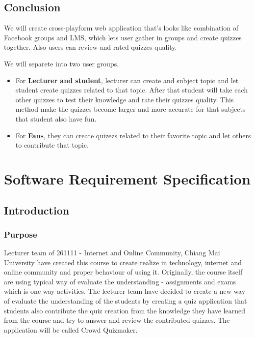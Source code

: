 \documentclass[ 10pt]{report}
\begin{document}
    \pagebreak
    \section{Conclusion}

    We will create cross-playform web application that's looks like combination of Facebook groups and LMS, which lets user gather in groups and create quizzes together. Also users can review and rated quizzes quality.

    We will separete into two user groups.
    \begin{itemize}
        \item For \textbf{Lecturer and student}, lecturer can create and subject topic and let student create quizzes related to that topic. After that student will take each other quizzes to test their knowledge and rate their quizzes quality. This method make the quizzes become larger and more accurate for that subjects that student also have fun.
        \item For \textbf{Fans}, they can create quizezs related to their favorite topic and let others to contribute that topic.
    \end{itemize}


    \chapter{Software Requirement Specification}
    \section{Introduction}
        \subsection{Purpose}
        Lecturer team of 261111 - Internet and Online Community, Chiang Mai University have created this course to create realize in technology, internet and online community and proper behaviour of using it. Originally, the course itself are using typical way of evaluate the understanding - assignments and exams which is one-way activities. The lecturer team have decided to create a new way of evaluate the understanding of the students by creating a quiz application that students also contribute the quiz creation from the knowledge they have learned from the course and try to answer and review the contributed quizzes. The application will be called Crowd Quizmaker.
\end{document}
